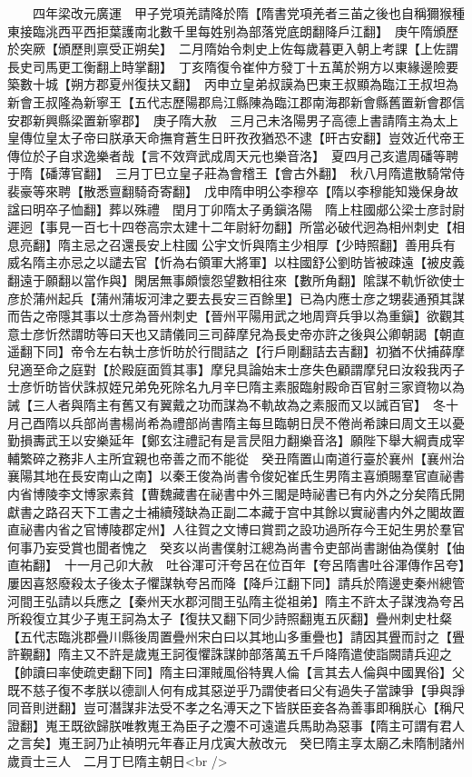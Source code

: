 　　四年梁改元廣運　甲子党項羌請降於隋【隋書党項羌者三苖之後也自稱獮猴種東接臨洮西平西拒葉護南北數千里每姓别為部落党底朗翻降戶江翻】　庚午隋頒歷於突厥【頒歷則禀受正朔矣】　二月隋始令刺史上佐每歲暮更入朝上考課【上佐謂長史司馬更工衡翻上時掌翻】　丁亥隋復令崔仲方發丁十五萬於朔方以東緣邊險要築數十城【朔方郡夏州復扶又翻】　丙申立皇弟叔謨為巴東王叔顯為臨江王叔坦為新會王叔隆為新寧王【五代志歷陽郡烏江縣陳為臨江郡南海郡新會縣舊置新會郡信安郡新興縣梁置新寧郡】　庚子隋大赦　三月己未洛陽男子高德上書請隋主為太上皇傳位皇太子帝曰朕承天命撫育蒼生日旰孜孜猶恐不逮【旰古安翻】豈效近代帝王傳位於子自求逸樂者哉【言不效齊武成周天元也樂音洛】　夏四月己亥遣周磻等聘于隋【磻薄官翻】　三月丁巳立皇子莊為會稽王【會古外翻】　秋八月隋遣散騎常侍裴豪等來聘【散悉亶翻騎奇寄翻】　戊申隋申明公李穆卒【隋以李穆能知幾保身故諡曰明卒子恤翻】葬以殊禮　閏月丁卯隋太子勇鎭洛陽　隋上柱國郕公梁士彦討尉遲迥【事見一百七十四卷高宗太建十二年尉紆勿翻】所當必破代迥為相州刺史【相息亮翻】隋主忌之召還長安上柱國公宇文忻與隋主少相厚【少時照翻】善用兵有威名隋主亦忌之以譴去官【忻為右領軍大將軍】以柱國舒公劉昉皆被疎遠【被皮義翻遠于願翻以當作與】閑居無事頗懷怨望數相往來【數所角翻】隂謀不軌忻欲使士彦於蒲州起兵【蒲州蒲坂河津之要去長安三百餘里】已為内應士彦之甥裴通預其謀而告之帝隱其事以士彦為晉州刺史【晉州平陽用武之地周齊兵爭以為重鎭】欲觀其意士彦忻然謂昉等曰天也又請儀同三司薛摩兒為長史帝亦許之後與公卿朝謁【朝直遥翻下同】帝令左右執士彦忻昉於行間詰之【行戶剛翻詰去吉翻】初猶不伏捕薛摩兒適至命之庭對【於殿庭面質其事】摩兒具論始末士彦失色顧謂摩兒曰汝殺我丙子士彦忻昉皆伏誅叔姪兄弟免死除名九月辛巳隋主素服臨射殿命百官射三家資物以為誡【三人者與隋主有舊又有翼戴之功而謀為不軌故為之素服而又以誡百官】　冬十月己酉隋以兵部尚書楊尚希為禮部尚書隋主每旦臨朝日昃不倦尚希諫曰周文王以憂勤損夀武王以安樂延年【鄭玄注禮記有是言昃阻力翻樂音洛】願陛下舉大綱責成宰輔繁碎之務非人主所宜親也帝善之而不能從　癸丑隋置山南道行臺於襄州【襄州治襄陽其地在長安南山之南】以秦王俊為尚書令俊妃崔氏生男隋主喜頒賜羣官直祕書内省博陵李文博家素貧【曹魏藏書在祕書中外三閣是時祕書已有内外之分矣隋氏開獻書之路召天下工書之士補續殘缺為正副二本藏于宫中其餘以實祕書内外之閣故置直祕書内省之官博陵郡定州】人往賀之文博曰賞罰之設功過所存今王妃生男於羣官何事乃妄受賞也聞者愧之　癸亥以尚書僕射江總為尚書令吏部尚書謝伷為僕射【伷直祐翻】　十一月己卯大赦　吐谷渾可汗夸呂在位百年【夸呂隋書吐谷渾傳作呂夸】屢因喜怒廢殺太子後太子懼謀執夸呂而降【降戶江翻下同】請兵於隋邊吏秦州總管河間王弘請以兵應之【秦州天水郡河間王弘隋主從祖弟】隋主不許太子謀洩為夸呂所殺復立其少子嵬王訶為太子【復扶又翻下同少詩照翻嵬五灰翻】疊州刺史杜粲【五代志臨洮郡疊川縣後周置疊州宋白曰以其地山多重疊也】請因其舋而討之【舋許覲翻】隋主又不許是歲嵬王訶復懼誅謀帥部落萬五千戶降隋遣使詣闕請兵迎之【帥讀曰率使疏吏翻下同】隋主曰渾賊風俗特異人倫【言其去人倫與中國異俗】父既不慈子復不孝朕以德訓人何有成其惡逆乎乃謂使者曰父有過失子當諫爭【爭與諍同音則迸翻】豈可潛謀非法受不孝之名溥天之下皆朕臣妾各為善事即稱朕心【稱尺證翻】嵬王既欲歸朕唯教嵬王為臣子之灋不可遠遣兵馬助為惡事【隋主可謂有君人之言矣】嵬王訶乃止禎明元年春正月戊寅大赦改元　癸巳隋主享太廟乙未隋制諸州歲貢士三人　二月丁巳隋主朝日<br />
